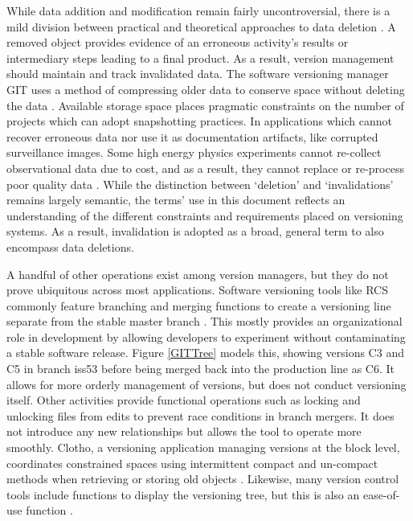 While data addition and modification remain fairly uncontroversial, there is a mild division between practical and theoretical approaches to data deletion \cite{Flouris04clotho:transparent}.
A removed object provides evidence of an erroneous activity's results or intermediary steps leading to a final product.
As a result, version management should maintain and track invalidated data.
The software versioning manager GIT uses a method of compressing older data to conserve space without deleting the data \cite{Chacon:2009:PG:1618548}.
Available storage space places pragmatic constraints on the number of projects which can adopt snapshotting practices.
In applications which cannot recover erroneous data nor use it as documentation artifacts, like corrupted surveillance images.
Some high energy physics experiments cannot re-collect observational data due to cost, and as a result, they cannot replace or re-process poor quality data \cite{Cavanaugh2002}.
While the distinction between `deletion' and `invalidations' remains largely semantic, the terms' use in this document reflects an understanding of the different constraints and requirements placed on versioning systems.
As a result, invalidation is adopted as a broad, general term to also encompass data deletions.

A handful of other operations exist among version managers, but they do not prove ubiquitous across most applications.
Software versioning tools like RCS commonly feature branching and merging functions to create a versioning line separate from the stable master branch \cite{tichy1985rcs}.
This mostly provides an organizational role in development by allowing developers to experiment without contaminating a stable software release.
Figure \ref{GITTree} models this, showing versions C3 and C5 in branch iss53 before being merged back into the production line as C6.
It allows for more orderly management of versions, but does not conduct versioning itself.
Other activities provide functional operations such as locking and unlocking files from edits to prevent race conditions in branch mergers.
It does not introduce any new relationships but allows the tool to operate more smoothly.
Clotho, a versioning application managing versions at the block level, coordinates constrained spaces using intermittent compact and un-compact methods when retrieving or storing old objects \cite{Flouris04clotho:transparent}.
Likewise, many version control tools include functions to display the versioning tree, but this is also an ease-of-use function \cite{Dijkstra1994}.

